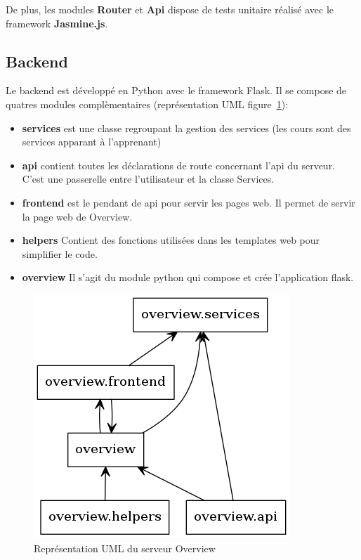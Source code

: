 \documentclass[a4paper,11pt]{report}
\begin{document}
De plus, les modules \textbf{Router} et \textbf{Api} dispose de tests unitaire réalisé avec le framework \textbf{Jasmine.js}.

\subsection{Backend}

Le backend est développé en Python avec le framework Flask. Il se compose de quatres modules complèmentaires (représentation UML figure~\ref{uml-overview-module}):

\begin{itemize}
  \item \textbf{services} est une classe regroupant la gestion des services (les cours sont des services apparant à l'apprenant)
  \item \textbf{api} contient toutes les déclarations de route concernant l'api du serveur. C'est une passerelle entre l'utilisateur et la classe Services.
  \item \textbf{frontend} est le pendant de api pour servir les pages web. Il permet de servir la page web de Overview.
  \item \textbf{helpers} Contient des fonctions utilisées dans les templates web pour simplifier le code.
  \item \textbf{overview} Il s'agit du module python qui compose et crée l'application flask.
\end{itemize}

\begin{figure}[h]
   \caption{\label{uml-overview-module} Représentation UML du serveur Overview}
   \centering
   \includegraphics[scale=0.8, keepaspectratio=true]{packages_overview.png}
\end{figure}
\end{document}
